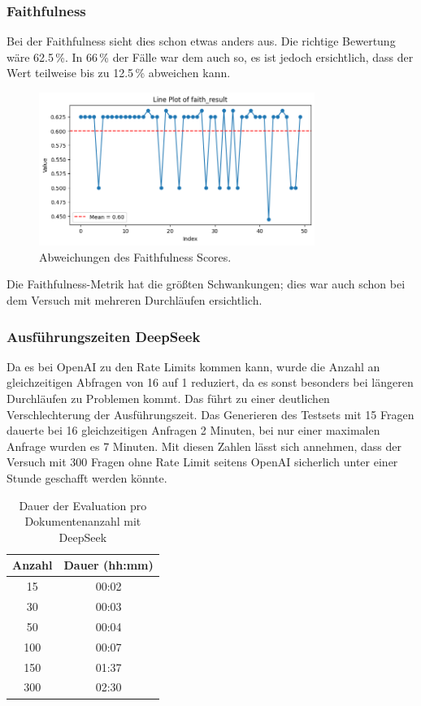 \subsubsection{Faithfulness}
Bei der Faithfulness sieht dies schon etwas anders aus. Die richtige Bewertung wäre 62.5\,\%. In 66\,\% der Fälle war dem auch so, es ist jedoch ersichtlich, dass der Wert teilweise bis zu 12.5\,\% abweichen kann.

\begin{figure}[htbp]
    \centering
    \includegraphics[width=0.8\textwidth]{images/faithfullness.png}
    \caption{Abweichungen des Faithfulness Scores.}
    \label{fig:faithfulness_deviation}
\end{figure}

Die Faithfulness-Metrik hat die größten Schwankungen; dies war auch schon bei dem Versuch mit mehreren Durchläufen ersichtlich.

\subsubsection{Ausführungszeiten DeepSeek}
Da es bei OpenAI zu den Rate Limits kommen kann, wurde die Anzahl an gleichzeitigen Abfragen von 16 auf 1 reduziert, da es sonst besonders bei längeren Durchläufen zu Problemen kommt.
Das führt zu einer deutlichen Verschlechterung der Ausführungszeit.
Das Generieren des Testsets mit 15 Fragen dauerte bei 16 gleichzeitigen Anfragen 2 Minuten, bei nur einer maximalen Anfrage wurden es 7 Minuten.
Mit diesen Zahlen lässt sich annehmen, dass der Versuch mit 300 Fragen ohne Rate Limit seitens OpenAI sicherlich unter einer Stunde geschafft werden könnte.

\begin{table}[h!]
    \centering
    \begin{tabular}{|c|c|}
    \hline
    \textbf{Anzahl} & \textbf{Dauer (hh:mm)} \\
    \hline
    15   & 00:02 \\
    30   & 00:03 \\
    50   & 00:04 \\
    100  & 00:07 \\
    150  & 01:37 \\
    300  & 02:30 \\
    \hline
    \end{tabular}
    \caption{Dauer der Evaluation pro Dokumentenanzahl mit DeepSeek}
\end{table}


